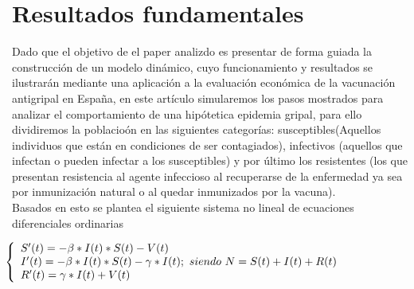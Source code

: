 \documentclass{wscpaperproc}
\theoremstyle{wsc}
\begin{document}
\section{Resultados fundamentales}
Dado que el objetivo de el paper analizdo es presentar de forma guiada la
construcción de un modelo dinámico, cuyo funcionamiento y resultados se ilustrarán mediante una aplicación a la evaluación
económica de la vacunación antigripal en España, en este art\'iculo simularemos los pasos
mostrados para analizar el comportamiento de una hip\'otetica epidemia gripal,
para ello dividiremos la poblacio\'on en las siguientes categor\'ias:
susceptibles(Aquellos individuos que están en condiciones de ser contagiados),
infectivos (aquellos que infectan o pueden
infectar a los susceptibles) y por último los resistentes (los que presentan
resistencia al agente infeccioso al recuperarse de la enfermedad ya sea por inmunización natural
o al quedar inmunizados por la vacuna).
\\
Basados en esto se plantea el siguiente sistema no lineal de ecuaciones diferenciales ordinarias

\begin{equation}
\hspace{-7em}
\begin{aligned}
\left\{
\begin{array}{l}
S'(t) = -\beta*I(t)*S(t)-V(t) \\
I'(t) = -\beta*I(t)*S(t)- \gamma*I(t); \ siendo \ N = S(t)+I(t)+R(t)\\
R'(t) = \gamma*I(t)+ V(t)
\end{array}
\right.
\end{aligned}
\end{equation}
\end{document}
